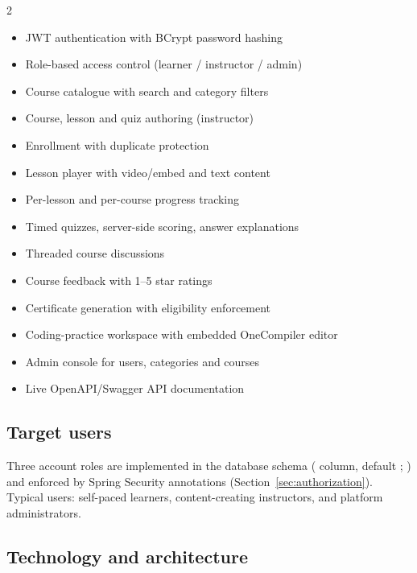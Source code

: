 \begin{multicols}{2}
\begin{itemize}
    \item JWT authentication with BCrypt password hashing
    \item Role-based access control (learner / instructor / admin)
    \item Course catalogue with search and category filters
    \item Course, lesson and quiz authoring (instructor)
    \item Enrollment with duplicate protection
    \item Lesson player with video/embed and text content
    \item Per-lesson and per-course progress tracking
    \item Timed quizzes, server-side scoring, answer explanations
    \item Threaded course discussions
    \item Course feedback with 1--5 star ratings
    \item Certificate generation with eligibility enforcement
    \item Coding-practice workspace with embedded OneCompiler editor
    \item Admin console for users, categories and courses
    \item Live OpenAPI/Swagger API documentation
\end{itemize}
\end{multicols}

\subsection{Target users}

Three account roles are implemented in the database schema ( column, default ; ) and enforced by Spring Security annotations (Section~\ref{sec:authorization}). Typical users: self-paced learners, content-creating instructors, and platform administrators.

\subsection{Technology and architecture}

